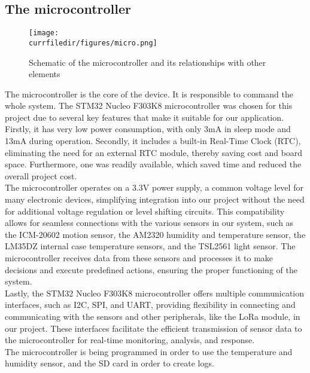 \newpage
\subsection{The microcontroller}

\begin{figure}[!h]
    \centering
    \texttt{[image: \\currfiledir/figures/micro.png]}
    \caption{Schematic of the microcontroller and its relationships with other elements}
\end{figure}

The microcontroller is the core of the device. It is responsible to command the whole system. The STM32 Nucleo F303K8 microcontroller was chosen for this project due to several key features that make it suitable for our application. Firstly, it has very low power consumption, with only 3mA in sleep mode and 13mA during operation. Secondly, it includes a built-in Real-Time Clock (RTC), eliminating the need for an external RTC module, thereby saving cost and board space. Furthermore, one was readily available, which saved time and reduced the overall project cost.\\
The microcontroller operates on a 3.3V power supply, a common voltage level for many electronic devices, simplifying integration into our project without the need for additional voltage regulation or level shifting circuits. This compatibility allows for seamless connections with the various sensors in our system, such as the ICM-20602 motion sensor, the AM2320 humidity and temperature sensor, the LM35DZ internal case temperature sensors, and the TSL2561 light sensor. The microcontroller receives data from these sensors and processes it to make decisions and execute predefined actions, ensuring the proper functioning of the system.\\
Lastly, the STM32 Nucleo F303K8 microcontroller offers multiple communication interfaces, such as I2C, SPI, and UART, providing flexibility in connecting and communicating with the sensors and other peripherals, like the LoRa module, in our project. These interfaces facilitate the efficient transmission of sensor data to the microcontroller for real-time monitoring, analysis, and response.\\
The microcontroller is being programmed in order to use the temperature and humidity sensor, and the SD card in order to create logs.
